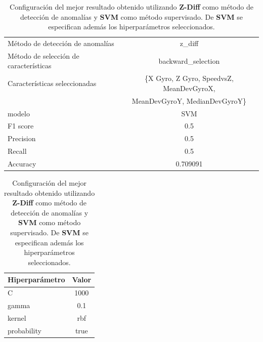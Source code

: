 \begin{appendices}
		\begin{table}[htb]
			\centering
			\caption{Configuración del mejor resultado obtenido utilizando \textbf{Z-Diff} como método de detección de anomalías y \textbf{SVM}
			como método supervisado. De \textbf{SVM} se especifican además los hiperparámetros seleccionados.}
			\label{table:26}
			\begin{tabular}{lc}
				\toprule
					  Método de detección de anomalías &                                             z\_diff \\
				Método de selección de características &                                 backward\_selection \\
						 Características seleccionadas & \{X Gyro, Z Gyro, SpeedvsZ, MeanDevGyroX, \\
						 							   &      MeanDevGyroY, MedianDevGyroY\} \\
												modelo &                                                SVM \\
											  F1 score &                                                0.5 \\
											 Precision &                                                0.5 \\
												Recall &                                                0.5 \\
											  Accuracy &                                           0.709091 \\
				\bottomrule
				\end{tabular}
			\newline
			\newline

			\begin{tabular}{lc}
			\toprule
			Hiperparámetro & Valor \\
			\midrule
						 C &  1000 \\
					 gamma &   0.1 \\
					kernel &   rbf \\
			   probability &  true \\
			\bottomrule
			\end{tabular}
			
		\end{table}

		\begin{table}[htb]
			\centering
			\caption{Configuración del mejor resultado obtenido utilizando \textbf{DBSCAN} como método de detección de anomalías y \textbf{SVM}
			como método supervisado. De \textbf{SVM} se especifican además los hiperparámetros seleccionados.}
			\label{table:27}


\end{table}
\end{appendices}
